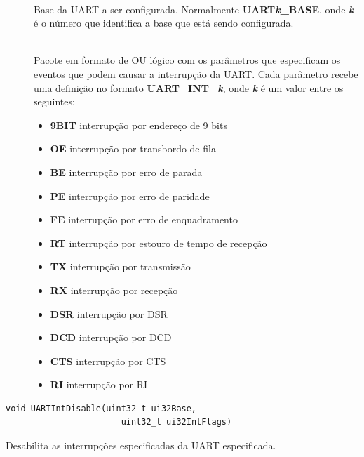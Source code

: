 \begin{description}
	\item []\hfill \\
	Base da UART a ser configurada. Normalmente \textbf{UART\emph{k}\_BASE}, onde \textbf{\emph{k}} é o número que identifica a base que está sendo configurada.
	
	\item []\hfill \\
	Pacote em formato de OU lógico com os parâmetros que especificam os eventos que podem causar a interrupção da UART. Cada parâmetro recebe uma definição no formato \textbf{UART\_INT\_\emph{k}}, onde \textbf{\emph{k}} é um valor entre os seguintes:
	\begin{itemize}
		\item \textbf{9BIT} interrupção por endereço de 9 bits
		\item \textbf{OE} interrupção por transbordo de fila
		\item \textbf{BE} interrupção por erro de parada
		\item \textbf{PE} interrupção por erro de paridade
		\item \textbf{FE} interrupção por erro de enquadramento
		\item \textbf{RT} interrupção por estouro de tempo de recepção
		\item \textbf{TX} interrupção por transmissão
		\item \textbf{RX} interrupção por recepção
		\item \textbf{DSR} interrupção por DSR
		\item \textbf{DCD} interrupção por DCD
		\item \textbf{CTS} interrupção por CTS
		\item \textbf{RI} interrupção por RI
	\end{itemize}
\end{description}

\begin{lstlisting}[style=funcao]
	void UARTIntDisable(uint32_t ui32Base,
					   uint32_t ui32IntFlags)
\end{lstlisting}

Desabilita as interrupções especificadas da UART especificada.

